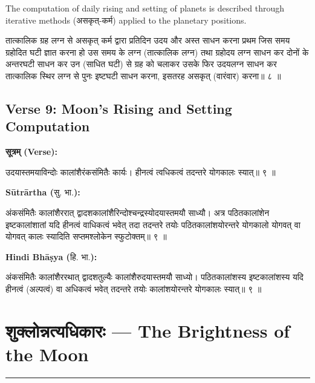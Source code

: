 \documentclass[11pt,a4paper]{article}
\newcommand{\dev}[1]{{\devanagarifont #1}}
\newcommand{\arth}{\textbf{Sūtrārtha (}\dev{सु. भा.}\textbf{):}\ }
\newcommand{\hindi}{\textbf{Hindi Bhāṣya (}\dev{हि. भा.}\textbf{):}\ }
\newenvironment{sanskritverse}{%
  \begin{center}\begin{minipage}{0.9\textwidth}
  \setlength{\leftskip}{1em}
  \setlength{\rightskip}{1em}
  \dev
}{\end{minipage}\end{center}}
\begin{document}
The computation of daily rising and setting of planets is described through
iterative methods (\dev{असकृत्-कर्म}) applied to the planetary positions.

\begin{sanskritverse}
तात्कालिक ग्रह लग्न से असकृत् कर्म द्वारा प्रतिदिन उदय और अस्त साधन करना
प्रथम जिस समय ग्रहोदित घटी ज्ञात करना हो उस समय के लग्न (तात्कालिक लग्न)
तथा ग्रहोदय लग्न साधन कर दोनों के अन्तरघटी साधन कर उन (साधित घटी) से ग्रह
को चलाकर उसके फिर उदयलग्न साधन कर तात्कालिक स्थिर लग्न से पुनः इष्टघटी
साधन करना, इसतरह असकृत् (वारंवार) करना॥ ८ ॥
\end{sanskritverse}

\subsection{Verse 9: Moon's Rising and Setting Computation}

\vspace{0.5em}
\noindent\textbf{\dev{सूत्रम् (Verse):}}
\begin{sanskritverse}
उदयास्तमयाविन्दोः कालांशैरंकसंमितैः कार्यः।
हीनत्वं त्वधिकत्वं तदन्तरे योगकालः स्यात्॥ ९ ॥
\end{sanskritverse}

\noindent\arth
\begin{sanskritverse}
अंकसंमितैः कालांशैररात् द्वादशकालांशैरिन्दोश्चन्द्रस्योदयास्तमयौ साध्यौ।
अत्र पठितकालांशेन इष्टकालांशातां यदि हीनत्वं वाधिकत्वं भवेत् तदा तदन्तरे तयोः
पठितकालांशयोरन्तरे योगकालो योगवत्‌ वा योगवत्‌ कालः स्यादिति सप्तमश्लोकेन
स्फुटोक्तम्॥ ९ ॥
\end{sanskritverse}

\noindent\hindi
\begin{sanskritverse}
अंकसंमितैः कालांशैररथात् द्वादशतुल्यैः कालांशैरुदयास्तमयौ साध्यो। पठितकालांशस्य
इष्टकालांशस्य यदि हीनत्वं (अल्पत्वं) वा अधिकत्वं भवेत् तदन्तरे तयोः कालांशयोरन्तरे
योगकालः स्यात्॥ ९ ॥
\end{sanskritverse}


\newpage
\section{\dev{शुक्लोन्नत्यधिकारः} — The Brightness of the Moon}
\label{sec:shuklonnati}

\begin{center}
\textcolor{rulecolor}{\rule{0.8\textwidth}{0.5pt}}
\end{center}
\end{document}
